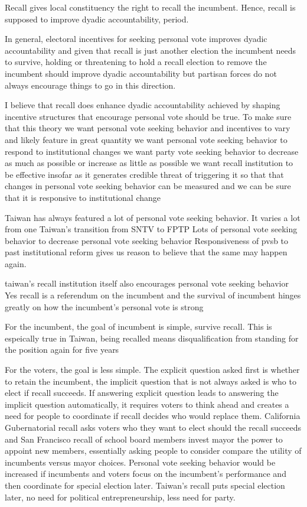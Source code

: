 \documentclass[hyphens, crop=false]{standalone}
\begin{document}
	Recall gives local constituency the right to recall the incumbent.
	Hence,
	recall is supposed to improve dyadic accountability, period.
	
	In general, electoral incentives for seeking personal vote improves dyadic accountability
	and given that recall is just another election the incumbent needs to survive,
	holding or threatening to hold a recall election to remove the incumbent should improve dyadic accountability
	but partisan forces do not always encourage things to go in this direction.
	
	I believe that recall does enhance dyadic accountability achieved by shaping incentive structures
	that encourage personal vote should be true.
	To make sure that this theory
	we want personal vote seeking behavior and incentives to vary and likely feature in great quantity
	we want personal vote seeking behavior to respond to institutional changes
	we want party vote seeking behavior to decrease as much as possible or increase as little as possible
	we want recall institution to be effective insofar as it generates credible threat of triggering it
	so that that changes in personal vote seeking behavior can be measured and
	we can be sure that it is responsive to institutional change
	
	Taiwan has always featured a lot of personal vote seeking behavior.
	It varies a lot from one
	Taiwan's transition from SNTV to FPTP
	Lots of personal vote seeking behavior to decrease personal vote seeking behavior
	Responsiveness of pvsb to past institutional reform gives us reason to believe that the same may happen again.
	
	taiwan's recall institution itself also encourages personal vote seeking behavior
	Yes recall is a referendum on the incumbent and the survival of incumbent hinges greatly on how
	the incumbent's personal vote is strong
	
	For the incumbent, the goal of incumbent is simple, survive recall.
	This is espeically true in Taiwan, being recalled means disqualification from standing for the position again for five years

	For the voters, the goal is less simple.
	The explicit question asked first is whether to retain the incumbent,
	the implicit question that is not always asked is who to elect if recall succeeds.
	If answering explicit question leads to answering the implicit question automatically,
	it requires voters to think ahead and creates a need for people to coordinate
	if recall decides who would replace them.
	California Gubernatorial recall asks voters who they want to elect should the recall succeeds
	and San Francisco recall of school board members invest mayor the power to appoint new members,
	essentially asking people to consider compare the utility of incumbents versus mayor choices.
	Personal vote seeking behavior would be increased
	if incumbents and voters focus on the incumbent's performance 
	and then coordinate for special election later.
	Taiwan's recall puts special election later,
	no need for political entrepreneurship, less need for party.
	
\end{document}

